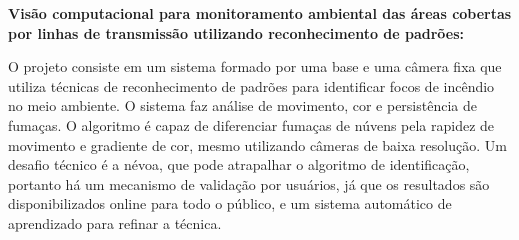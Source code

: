 
\textbf{Visão computacional para monitoramento ambiental das áreas cobertas por
linhas de transmissão utilizando reconhecimento de padrões:}

O projeto consiste em um sistema formado por uma base e uma câmera fixa que
utiliza técnicas de reconhecimento de padrões para identificar focos de incêndio
no meio ambiente. O sistema faz análise de movimento, cor e
persistência de fumaças. O algoritmo é capaz de diferenciar fumaças de núvens
pela rapidez de movimento e gradiente de cor, mesmo utilizando câmeras de baixa
resolução. Um desafio técnico é a névoa, que pode atrapalhar o algoritmo de
identificação, portanto há um mecanismo de validação por usuários, já que os
resultados são disponibilizados online para todo o público, e um sistema
automático de aprendizado para refinar a técnica.
